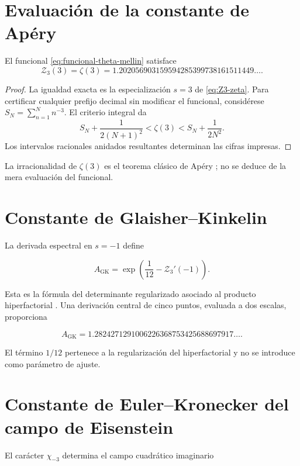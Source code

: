 \section{Evaluación de la constante de Apéry}

\begin{proposition}
\label{prop:evaluacion-apery}
El funcional \eqref{eq:funcional-theta-mellin} satisface
\[
 \boxed{
 \mathcal Z_3(3)=\zeta(3)
 =1.202056903159594285399738161511449\ldots}.
\]
\end{proposition}

\begin{proof}
La igualdad exacta es la especialización $s=3$ de \eqref{eq:Z3-zeta}.
Para certificar cualquier prefijo decimal sin modificar el funcional,
considérese $S_N=\sum_{n=1}^{N}n^{-3}$. El criterio integral da
\[
 S_N+\frac1{2(N+1)^2}
 <\zeta(3)<
 S_N+\frac1{2N^2}.
\]
Los intervalos racionales anidados resultantes determinan las cifras
impresas.
\end{proof}

La irracionalidad de $\zeta(3)$ es el teorema clásico de Apéry
\cite{Apery1979}; no se deduce de la mera evaluación del funcional.

\section{Constante de Glaisher--Kinkelin}

La derivada espectral en $s=-1$ define

\begin{equation}
 \boxed{
 A_{\mathrm{GK}}
 =\exp\!\left(\frac1{12}-\mathcal Z_3'(-1)\right)}.
 \label{eq:glaisher-kinkelin-espectral}
\end{equation}

Esta es la fórmula del determinante regularizado asociado al producto
hiperfactorial \cite{Vardi1988}. Una derivación central de cinco puntos,
evaluada a dos escalas, proporciona

\[
 A_{\mathrm{GK}}
 =1.2824271291006226368753425688697917\ldots.
\]

El término $1/12$ pertenece a la regularización del hiperfactorial y no se
introduce como parámetro de ajuste.

\section{Constante de Euler--Kronecker del campo de Eisenstein}

El carácter $\chi_{-3}$ determina el campo cuadrático imaginario

